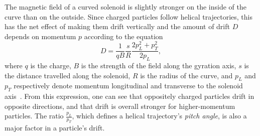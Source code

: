 The magnetic field of a curved solenoid is slightly stronger on the inside of
the curve than on the outside. Since charged particles follow helical
trajectories, this has the net effect of making them drift vertically and the
amount of drift $D$ depends on momentum $p$ according to the equation
\begin{equation*}
    D = \frac{1}{q B} \frac{s}{R} \frac{2 p^2_L + p^2_T}{2 p_L},
\end{equation*}
where $q$ is the charge, $B$ is the strength of the field along the gyration
axis, $s$ is the distance travelled along the solenoid, $R$ is the radius of the
curve, and $p_L$ and $p_T$ respectively denote momentum longitudinal and
transverse to the solenoid axis~\cite{ben_thesis}. From this expression, one can
see that oppositely charged particles drift in opposite directions, and that
drift is overall stronger for higher-momentum particles. The ratio
$\frac{p_L}{p_T}$, which defines a helical trajectory's \emph{pitch angle}, is
also a major factor in a particle's drift.


